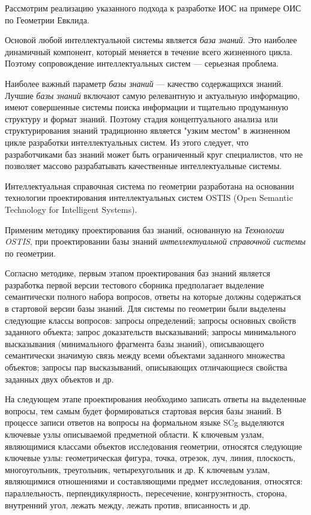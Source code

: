 Рассмотрим реализацию указанного подхода к разработке ИОС на примере ОИС по Геометрии Евклида.

Основой любой интеллектуальной системы является \textit{база знаний}. Это наиболее динамичный компонент, который меняется в течение всего жизненного цикла. Поэтому сопровождение интеллектуальных систем --- серьезная проблема.

Наиболее важный параметр \textit{базы знаний} --- качество содержащихся знаний. Лучшие \textit{базы знаний} включают самую релевантную и актуальную информацию, имеют совершенные системы поиска информации и тщательно продуманную структуру и формат знаний. Поэтому стадия концептуального анализа или структурирования знаний традиционно является "узким местом"{} в жизненном цикле разработки интеллектуальных систем. Из этого следует, что разработчиками баз знаний может быть ограниченный круг специалистов, что не позволяет массово разрабатывать качественные интеллектуальные системы.

Интеллектуальная справочная система по геометрии разработана на основании технологии проектирования интеллектуальных систем OSTIS (Open Semantic Technology for Intelligent Systems).

Применим методику проектирования баз знаний, основанную на \textit{Технологии OSTIS}, при проектировании базы знаний \textit{интеллектуальной справочной системы} по геометрии.

Согласно методике, первым этапом проектирования баз знаний является разработка первой версии тестового сборника предполагает выделение семантически полного набора вопросов, ответы на которые должны содержаться в стартовой версии базы знаний. Для системы по геометрии были выделены следующие классы вопросов: запросы определений; запросы основных свойств заданного объекта; запрос доказательств высказываний; запросы минимального высказывания (минимального фрагмента базы знаний), описывающего семантически значимую связь между всеми объектами заданного множества объектов; запросы пар высказываний, описывающих отличающиеся свойства заданных двух объектов и др.

На следующем этапе проектирования необходимо записать ответы на выделенные вопросы, тем самым будет формироваться стартовая версия базы знаний. В процессе записи ответов на вопросы на формальном языке SCg выделяются ключевые узлы описываемой предметной области. К ключевым узлам, являющимися классами объектов исследования геометрии, относятся следующие ключевые узлы: геометрическая фигура, точка, отрезок, луч, линия, плоскость, многоугольник, треугольник, четырехугольник и др. К ключевым узлам, являющимися отношениями и составляющими предмет исследования, относятся: параллельность, перпендикулярность, пересечение, конгруэнтность, сторона, внутренний угол, лежать между, лежать против, вписанность и др.

